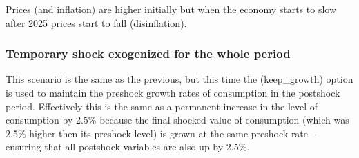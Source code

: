 \documentclass[letterpaper,10pt,english]{jupyterBook}
\begin{document}
\sphinxAtStartPar
Prices (and inflation) are higher initially but when the economy starts to slow after 2025 prices start to fall (disinflation).


\subsubsection{Temporary shock exogenized for the whole period}
\label{\detokenize{content/06_WBModels/ScenarioAnalysis:id1}}
\sphinxAtStartPar
This scenario is the same as the previous, but this time the  (keep\_growth) option is used to maintain the pre\sphinxhyphen{}shock growth rates of consumption in the post\sphinxhyphen{}shock period.  Effectively this is the same as a permanent increase in the level of consumption by 2.5\% because the final shocked value of consumption (which was 2.5\% higher then its pre\sphinxhyphen{}shock level) is grown at the same pre\sphinxhyphen{}shock rate – ensuring that all post\sphinxhyphen{}shock variables are also up by 2.5\%.
\end{document}
